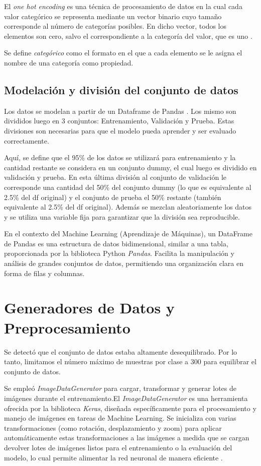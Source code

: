 El \textit{one hot encoding} es una técnica de procesamiento de datos en la cual cada valor categórico se representa 
mediante un vector binario cuyo tamaño corresponde al número de categorías posibles. En dicho vector, todos los elementos 
son cero, salvo el correspondiente a la categoría del valor, que es uno \cite{ohe}. 

Se define \textit{categórico} como el formato en el que a cada elemento se le asigna el nombre de una categoría como propiedad.

\subsection{Modelación y división del conjunto de datos}

 Los datos se modelan a partir de un Dataframe de Pandas  \cite{pandas}. Los mismo son divididos luego en 3 conjuntos: Entrenamiento, Validación y Prueba. 
 Estas divisiones son necesarias para que el modelo pueda aprender y ser evaluado correctamente. 
 
 Aquí, se define que el 95\% de los datos se utilizará para entrenamiento y la cantidad restante se considera en un conjunto dummy, el cual 
 luego es dividido en validación y prueba. En esta última división al conjunto de validación le corresponde una cantidad del 50\% del conjunto 
 dummy (lo que es equivalente al 2.5\% del df original) y el conjunto de prueba el 50\% restante (también equivalente al 2.5\% del df original).
 Además se mezclan aleatoriamente los datos y se utiliza una variable fija para garantizar que la división sea reproducible.

 En el contexto del Machine Learning (Aprendizaje de Máquinas), un DataFrame de Pandas es una estructura de datos bidimensional, similar a una tabla, 
 proporcionada por la biblioteca Python \textit{Pandas}. Facilita la manipulación y análisis de grandes conjuntos de datos, permitiendo 
 una organización clara en forma de filas y columnas.

\section{Generadores de Datos y Preprocesamiento}

Se detectó que el conjunto de datos estaba altamente desequilibrado. Por lo tanto, limitamos el número máximo de muestras por clase a 300 
para equilibrar el conjunto de datos. 

Se empleó \textit{ImageDataGenerator} \cite{img_gen} para cargar, transformar y generar lotes de imágenes durante el entrenamiento.El \textit{ImageDataGenerator} 
es una herramienta ofrecida por la biblioteca \textit{Keras}, diseñada específicamente para el procesamiento y manejo de imágenes en 
tareas de Machine Learning. Se inicializa con varias transformaciones (como rotación, desplazamiento y zoom) para aplicar 
automáticamente estas transformaciones a las imágenes a medida que se cargan devolver lotes de imágenes listos para el entrenamiento o la 
evaluación del modelo, lo cual permite alimentar la red neuronal de manera eficiente \cite{augmentation} .

